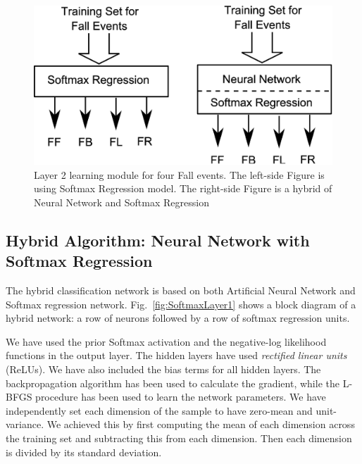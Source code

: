 \documentclass[]{IEEEtran}
\begin{document}
\begin{figure}[htbp]
	\centering
		\includegraphics[width=0.98\columnwidth]{figures/SoftmaxLayer2Fall.eps}
	\caption{Layer 2 learning module for four Fall events. The left-side Figure is using Softmax Regression model. The right-side Figure is a hybrid of Neural Network and Softmax Regression }
	\label{fig:SoftmaxLayer2Fall}
\end{figure}


\subsection{Hybrid Algorithm: Neural Network with Softmax Regression}
\label{sec:HybridAlgorithmNeuralNetworkAndSoftmaxRegreation}

The hybrid classification network is based on both Artificial Neural Network  and Softmax regression network. Fig.~\ref{fig:SoftmaxLayer1} shows a block diagram of a hybrid network: a row of neurons followed by a row of softmax regression units.
\par
We have used the prior Softmax activation  and the negative-log likelihood 
functions in the output layer. The hidden layers have used \emph{rectified linear units }(ReLUs). 
We have also included the bias terms for all hidden layers. The backpropagation algorithm\cite{Sarkar1995}
has been used to calculate the gradient, while the L-BFGS procedure has been used to 
learn the network parameters. We have independently set each dimension of the sample to 
have zero-mean and unit-variance. We achieved this by first computing the mean of each 
dimension across the training set and subtracting this from each dimension. Then each 
dimension is divided by its standard deviation.       
\end{document}

